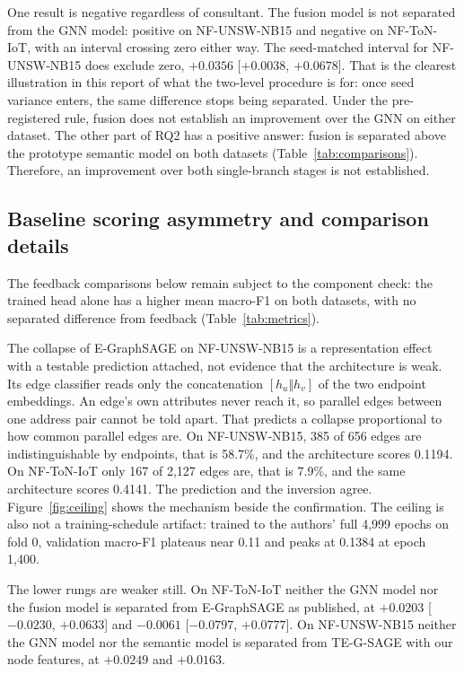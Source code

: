 One result is negative regardless of consultant. The fusion model is not separated from the GNN model:
positive on NF-UNSW-NB15 and negative on NF-ToN-IoT, with an interval crossing zero either way.
The seed-matched interval for NF-UNSW-NB15 does exclude zero, $+0.0356$ [$+0.0038$, $+0.0678$].
That is the clearest illustration in this report of what the two-level procedure is for: once
seed variance enters, the same difference stops being separated. Under the pre-registered rule,
fusion does not establish an improvement over the GNN on either dataset. The other part of RQ2 has a positive answer: fusion is separated above the prototype semantic model on both datasets (Table~\ref{tab:comparisons}). Therefore, an improvement over both single-branch stages is not established.

\FloatBarrier
\subsection{Baseline scoring asymmetry and comparison details}
\label{app:baseline-detail}

The feedback comparisons below remain subject to the component check: the trained head alone has a higher mean macro-F1 on both datasets, with no separated difference from feedback (Table~\ref{tab:metrics}).

The collapse of E-GraphSAGE on NF-UNSW-NB15 is a representation effect with a testable
prediction attached, not evidence that the architecture is weak. Its edge classifier reads only the
concatenation $[h_u \Vert h_v]$ of the two endpoint embeddings. An edge's own attributes never
reach it, so parallel edges between one address pair cannot be told apart. That predicts a
collapse
proportional to how common parallel edges are. On NF-UNSW-NB15, 385 of 656 edges are
indistinguishable by endpoints, that is 58.7\%, and the architecture scores 0.1194. On
NF-ToN-IoT only 167 of 2{,}127 edges are, that is 7.9\%, and the same architecture scores
0.4141. The prediction and the inversion agree. Figure~\ref{fig:ceiling} shows the mechanism
beside the confirmation.
The ceiling is also not a training-schedule artifact: trained to the authors' full 4{,}999
epochs on fold 0, validation macro-F1 plateaus near 0.11 and peaks at 0.1384 at epoch 1{,}400.

The lower rungs are weaker still. On NF-ToN-IoT neither the GNN model nor the fusion model is separated
from E-GraphSAGE as published, at $+0.0203$ [$-0.0230$, $+0.0633$] and $-0.0061$ [$-0.0797$,
$+0.0777$]. On NF-UNSW-NB15 neither the GNN model nor the semantic model is separated from
TE-G-SAGE with our node features, at $+0.0249$ and $+0.0163$.

